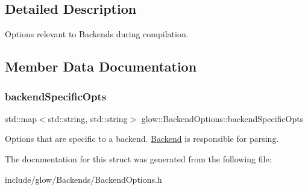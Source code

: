 \subsection{Detailed Description}
Options relevant to Backends during compilation. 

\subsection{Member Data Documentation}
\mbox{\label{structglow_1_1_backend_options_a512200407cdc1933ea8ceafd005e3ff4}} 
\subsubsection{\texorpdfstring{backend\+Specific\+Opts}{backendSpecificOpts}}
{\footnotesize\ttfamily std\+::map$<$std\+::string, std\+::string$>$ glow\+::\+Backend\+Options\+::backend\+Specific\+Opts}

Options that are specific to a backend. \hyperlink{classglow_1_1_backend}{Backend} is responsible for parsing. 

The documentation for this struct was generated from the following file\+:\begin{DoxyCompactItemize}
\item 
include/glow/\+Backends/Backend\+Options.\+h\end{DoxyCompactItemize}

